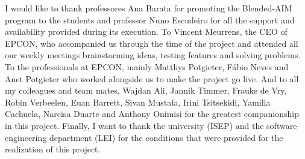 I would like to thank professores Ana Barata for promoting the Blended-AIM program to the students and professor Nuno Escudeiro for all the support and availability provided during its execution. To Vincent Meurrens, the CEO of EPCON, who accompanied us through the time of the project and attended all our weekly meetings brainstorming ideas, testing features and solving problems. To the professionals at EPCON, mainly Matthys Potgieter, Fábio Neves and Anet Potgieter who worked alongside us to make the project go live. And to all my colleagues and team mates, Wajdan Ali, Jannik Timmer, Frauke de Vry, Robin Verbeelen, Euan Barrett, Sivan Mustafa, Irini Tsitsekidi, Yamilla Cachuela, Narcisa Duarte and Anthony Onimisi for the greatest companionship in this project. Finally, I want to thank the university (ISEP) and the software engineering department (LEI) for the conditions that were provided for the realization of this project.
